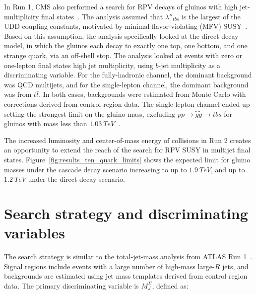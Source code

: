 In Run 1, CMS also performed a search for RPV decays of gluinos with high jet-multiplicity final states~\cite{analysis-cms-run1}.
The analysis assumed that $\lambda''_{tbs}$ is the largest of the UDD coupling constants, motivated by minimal flavor-violating (MFV) SUSY~\cite{susy-mfv}.
Based on this assumption, the analysis specifically looked at the direct-decay model, in which the gluinos each decay to exactly one top, one bottom, and one strange quark, via an off-shell stop.
The analysis looked at events with zero or one-lepton final states high jet multiplicity, using $b$-jet multiplicity as a discriminating variable\cite{analysis-cms-run1}.
For the fully-hadronic channel, the dominant background was QCD multijets, and for the single-lepton channel, the dominant background was from $t\bar{t}$.
In both cases, backgrounds were estimated from Monte Carlo with corrections derived from control-region data.
The single-lepton channel ended up setting the strongest limit on the gluino mass, excluding $pp\rightarrow\tilde{g}\tilde{g}\rightarrow tbs$ for gluinos with mass less than $1.03~TeV$~\cite{analysis-cms-run1}.

The increased luminosity and center-of-mass energy of collisions in Run 2 creates an opportunity to extend the reach of the search for RPV SUSY in multijet final states.
Figure~\ref{fig:results_ten_quark_limits} shows the expected limit for gluino masses under the cascade decay scenario increasing to up to $1.9~TeV$, and up to $1.2~TeV$ under the direct-decay scenario.

\section{Search strategy and discriminating variables}\label{sec:search_strategy}

The search strategy is similar to the total-jet-mass analysis from ATLAS Run 1~\cite{run1-multijet}.
Signal regions include events with a large number of high-mass large-$R$ jets, and backgrounds are estimated using jet mass templates derived from control region data.
The primary discriminating variable is $M_{J}^{\Sigma}$, defined as:


